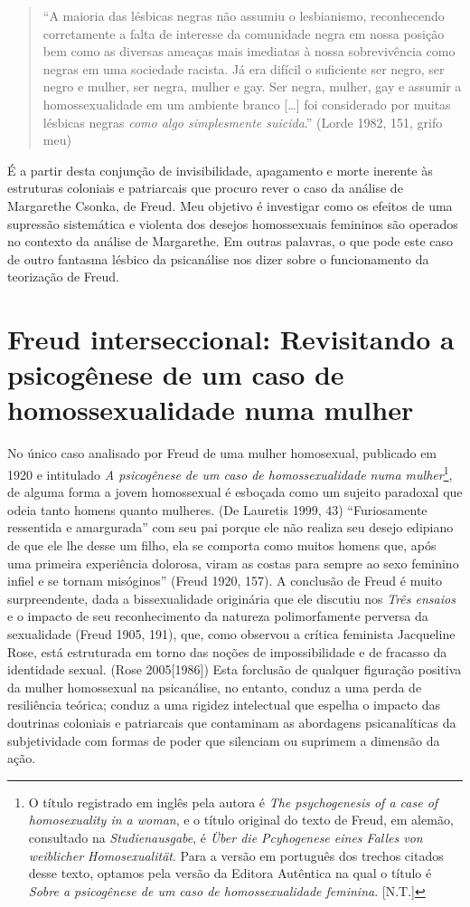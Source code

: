 \begin{quote}
``A maioria das lésbicas negras não assumiu o lesbianismo, reconhecendo
corretamente a falta de interesse da comunidade negra em nossa posição
bem como as diversas ameaças mais imediatas à nossa sobrevivência como
negras em uma sociedade racista. Já era difícil o suficiente ser negro,
ser negro e mulher, ser negra, mulher e gay. Ser negra, mulher, gay e
assumir a homossexualidade em um ambiente branco {[}\ldots{}{]} foi
considerado por muitas lésbicas negras \emph{como algo simplesmente
suicida}.'' (Lorde 1982, 151, grifo meu)
\end{quote}

É a partir desta conjunção de invisibilidade, apagamento e morte
inerente às estruturas coloniais e patriarcais que procuro rever o caso
da análise de Margarethe Csonka, de Freud. Meu objetivo é investigar
como os efeitos de uma supressão sistemática e violenta dos desejos
homossexuais femininos são operados no contexto da análise de
Margarethe. Em outras palavras, o que pode este caso de outro fantasma
lésbico da psicanálise nos dizer sobre o funcionamento da teorização de
Freud.

\section{Freud interseccional: Revisitando a psicogênese de um caso de
homossexualidade numa mulher }

No único caso analisado por Freud de uma mulher homosexual, publicado em
1920 e intitulado \emph{A psicogênese de um caso de homossexualidade
numa mulher}\footnote{O título registrado em inglês pela autora é
  \emph{The psychogenesis of a case of homosexuality in a woman}, e o
  título original do texto de Freud, em alemão, consultado na
  \emph{Studienausgabe}, é \emph{Über die Pcyhogenese eines Falles von
  weiblicher Homosexualität}. Para a versão em português dos trechos
  citados desse texto, optamos pela versão da Editora Autêntica na qual
  o título é \emph{Sobre a psicogênese de um caso de homossexualidade
  feminina}. {[}N.T.{]}}, de alguma forma a jovem homossexual é esboçada
como um sujeito paradoxal que odeia tanto homens quanto mulheres. (De
Lauretis 1999, 43) ``Furiosamente ressentida e amargurada'' com seu pai
porque ele não realiza seu desejo edipiano de que ele lhe desse um
filho, ela se comporta como muitos homens que, após uma primeira
experiência dolorosa, viram as costas para sempre ao sexo feminino
infiel e se tornam misóginos'' (Freud 1920, 157). A conclusão de Freud é
muito surpreendente, dada a bissexualidade originária que ele discutiu
nos \emph{Três ensaios} e o impacto de seu reconhecimento da natureza
polimorfamente perversa da sexualidade (Freud 1905, 191), que, como
observou a crítica feminista Jacqueline Rose, está estruturada em torno
das noções de impossibilidade e de fracasso da identidade sexual. (Rose
2005{[}1986{]}) Esta forclusão de qualquer figuração positiva da mulher
homossexual na psicanálise, no entanto, conduz a uma perda de
resiliência teórica; conduz a uma rigidez intelectual que espelha o
impacto das doutrinas coloniais e patriarcais que contaminam as
abordagens psicanalíticas da subjetividade com formas de poder que
silenciam ou suprimem a dimensão da ação.

